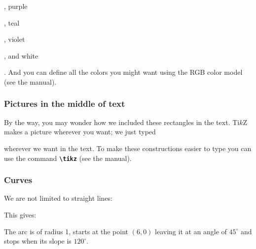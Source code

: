 \begin{frame}
, purple , teal , violet , and white . And you can define all the colors you might want using the RGB color model (see the manual).
\end{frame}

%
%
\begin{frame}[fragile]
  \frametitle{
    Pictures in the middle of text
  }

  By the way, you may wonder how we included these rectangles in the text. Ti$k$Z makes a picture wherever  you want; we just typed

  \begin{center}
    
  \end{center}

  wherever we want in the text. To make these constructions easier to type you can use the command {\tt \bf \textbackslash tikz}  (see the manual).

\end{frame}

%
%
\begin{frame}[fragile]
  \frametitle{
    Curves
  }

  We are not limited to straight lines:

  { \footnotesize
  
  }
  
  This gives:

  \begin{center}
    
  \end{center}

  The arc is of radius 1, starts at the point $(6,0)$ leaving it at an angle of $45^\circ$ and stops when its slope is $120^\circ$.

\end{frame}

